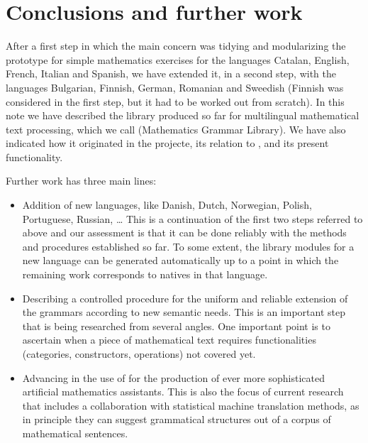 \documentclass[submission,copyright,creativecommons]{eptcs}
\begin{document}


\section{Conclusions and further work}

After a first step in which the main concern was tidying and modularizing
the \webalt{} prototype for simple mathematics exercises for the languages
Catalan,
English,
French,
Italian and
Spanish,
we have extended it, in a second step, with the languages
Bulgarian, Finnish,
German, Romanian and Sweedish
(Finnish was considered in the first step, but it had to be worked out from
scratch).
In this note we have described the \GF{} library produced so far for
multilingual mathematical text processing, which we call
\MGL{} (Mathematics Grammar Library). We have also indicated how it
originated in the \webalt{} projecte, its relation to \GF{}, and its
present functionality.

Further work has three main lines:
\begin{itemize}
\item
Addition of new languages,
like Danish, Dutch, Norwegian, Polish, Portuguese, Russian, \ldots
This is a continuation of the first two steps referred to above and
our assessment is that it can be done reliably with the methods and
procedures established so far. To some extent, the library modules for a
new language can be generated automatically up to a point in which the
remaining work corresponds to natives in that language.
\item
Describing a controlled procedure for the uniform and reliable extension
of the grammars according to new semantic needs. This is an important step
that is being researched from several angles. One important point is to
ascertain when a piece of mathematical text requires functionalities
(categories, constructors, operations) not covered yet.
\item
Advancing in the use of \MGL{} for the production of ever more
sophisticated artificial mathematics assistants. This is also the focus of
current research that includes a collaboration with statistical machine
translation methods, as in principle they can suggest grammatical structures
out of a corpus of mathematical sentences.
\end{itemize}




\end{document}
